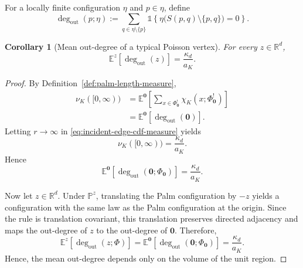 \documentclass[a4paper,fleqn]{cas-dc}
\numberwithin{equation}{section}
\newcommand{\R}{\mathds{R}}
\newcommand{\Pp}{\mathds{P}}
\newcommand{\E}{\mathds{E}}
\newcommand{\1}{\mathds{1}}
\newcommand{\0}{\mathbf{0}}
\newtheorem{corollary}[theorem]{Corollary}
\begin{document}
For a locally finite configuration \(\eta\) and \(p\in\eta\), define
\begin{equation}
\deg_{\mathrm{out}}(p;\eta)
:=
\sum_{q\in\eta\setminus\{p\}}
\1\left\{
\eta\bigl(S(p,q)\setminus\{p,q\}\bigr)=0
\right\}.
\label{eq:outdegree-definition}
\end{equation}


\begin{corollary}[Mean out-degree of a typical Poisson vertex]
\label{cor:mean-outdegree}
For every \(z\in\R^d\),
\begin{equation}
\label{eq:mean-outdegree}
\E^{z}\left[\deg_{\mathrm{out}}(z)\right]
=
\frac{\kappa_d}{a_K}.
\end{equation}
\end{corollary}

\begin{proof}
By Definition~\ref{def:palm-length-measure},
\begin{equation}
\label{eq:outdegree-palm-identity}
\begin{aligned}
\nu_K([0,\infty))
&=\E^{\0}\left[
\sum_{x\in\Phi_{\0}^{!}}
\chi_K(x;\Phi_{\0}^{!})
\right]\\
&=\E^{\0}\left[\deg_{\mathrm{out}}(\0)\right].
\end{aligned}
\end{equation}
Letting \(r\to\infty\) in
\eqref{eq:incident-edge-cdf-measure} yields
\begin{equation}
\label{eq:mean-outdegree-origin}
\nu_K([0,\infty))
=
\frac{\kappa_d}{a_K}.
\end{equation}
Hence
\begin{equation}
\E^{\0}\left[
    \deg_{\mathrm{out}}
\left(
\0;
\Phi_{\0}
\right)
\right]
=
\frac{\kappa_d}{a_K}.
\end{equation}

Now let \(z\in\R^d\). Under \(\Pp^z\), translating the Palm
configuration by \(-z\) yields a configuration with the same law as the
Palm configuration at the origin. Since the rule is translation
covariant, this translation preserves directed adjacency and maps the
out-degree of \(z\) to the out-degree of \(\0\). Therefore,
\begin{equation}
\E^{z}\left[
    \deg_{\mathrm{out}}
\left(
z;
\Phi
\right)
\right]
=
\E^{\0}\left[
    \deg_{\mathrm{out}}
\left(
\0;
\Phi_{\0}
\right)
\right]
=
\frac{\kappa_d}{a_K}.
\end{equation}
Hence, the mean out-degree depends only on the volume of the unit region.
\end{proof}
\end{document}
